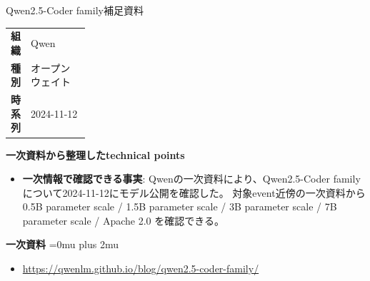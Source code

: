 \begin{technicalnote}{Qwen2.5-Coder family}{補足資料}
\begingroup
\begin{tabularx}{\linewidth}{@{}>{\bfseries}p{0.22\linewidth}X@{}}
組織 & Qwen \\
種別 & オープンウェイト \\
時系列 & 2024-11-12 \\
\end{tabularx}
\smallskip
{\bfseries 一次資料から整理したtechnical points}
\begin{itemize}[leftmargin=1.5em,itemsep=0.35em]
\item \textbf{一次情報で確認できる事実}: Qwenの一次資料により、Qwen2.5-Coder familyについて2024-11-12にモデル公開を確認した。 対象event近傍の一次資料から 0.5B parameter scale / 1.5B parameter scale / 3B parameter scale / 7B parameter scale / Apache 2.0 を確認できる。
\end{itemize}
\begin{minipage}{\linewidth}
\begin{samepage}
{\bfseries 一次資料}
\begingroup\sloppy
\Urlmuskip=0mu plus 2mu\relax
\begin{itemize}[leftmargin=1.5em,itemsep=0.25em]
\item {\scriptsize\url{https://qwenlm.github.io/blog/qwen2.5-coder-family/}}
\end{itemize}
\endgroup
\end{samepage}
\end{minipage}
\endgroup
\end{technicalnote}
\medskip

